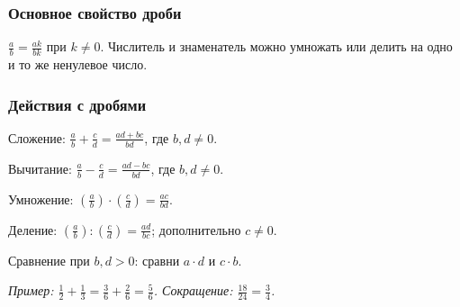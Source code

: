 \documentclass[12pt,a4paper]{article}
\theoremstyle{definition}
\theoremstyle{plain}
\theoremstyle{remark}
\begin{document}
\subsubsection*{Основное свойство дроби}
\(\frac{a}{b} = \frac{ak}{bk}\) при \(k \ne  0\). Числитель и знаменатель можно умножать или делить на одно и то же ненулевое число.\par
\subsubsection*{Действия с дробями}
Сложение: \(\frac{a}{b} + \frac{c}{d} = \frac{ad + bc}{bd}\), где \(b,\allowbreak d \ne  0\).\par
Вычитание: \(\frac{a}{b} - \frac{c}{d} = \frac{ad - bc}{bd}\), где \(b,\allowbreak d \ne  0\).\par
Умножение: \((\frac{a}{b}) \cdot  (\frac{c}{d}) = \frac{ac}{bd}\).\par
Деление: \((\frac{a}{b}) : (\frac{c}{d}) = \frac{ad}{bc}\); дополнительно \(c \ne  0\).\par
Сравнение при \(b,\allowbreak d > 0\): сравни \(a \cdot  d\) и \(c \cdot  b\).\par
{\small\textit{Пример: \(\frac{1}{2} + \frac{1}{3} = \frac{3}{6} + \frac{2}{6} = \frac{5}{6}\). Сокращение: \(\frac{18}{24} = \frac{3}{4}\).}}\par
\end{document}
